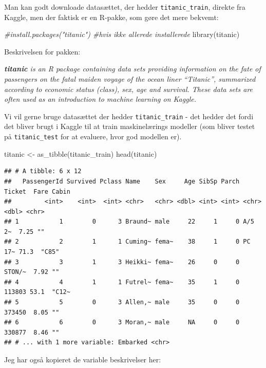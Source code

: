 \documentclass[
]{book}
\newenvironment{Shaded}{\begin{snugshade}}{\end{snugshade}}
\newcommand{\CommentTok}[1]{\textcolor[rgb]{0.56,0.35,0.01}{\textit{#1}}}
\newcommand{\FunctionTok}[1]{\textcolor[rgb]{0.00,0.00,0.00}{#1}}
\newcommand{\NormalTok}[1]{#1}
\newcommand{\OtherTok}[1]{\textcolor[rgb]{0.56,0.35,0.01}{#1}}
\begin{document}
Man kan godt downloade datasættet, der hedder \texttt{titanic\_train}, direkte fra Kaggle, men der faktisk er en R-pakke, som gøre det mere bekvemt:

\begin{Shaded}
\begin{Highlighting}[]
\CommentTok{\#install.packages("titanic") \#hvis ikke allerede installerede}
\FunctionTok{library}\NormalTok{(titanic)}
\end{Highlighting}
\end{Shaded}

Beskrivelsen for pakken:

\emph{\textbf{titanic} is an R package containing data sets providing information on the fate of passengers on the fatal maiden voyage of the ocean liner ``Titanic'', summarized according to economic status (class), sex, age and survival. These data sets are often used as an introduction to machine learning on Kaggle.}

Vi vil gerne bruge datasættet der hedder \texttt{titanic\_train} - det hedder det fordi det bliver brugt i Kaggle til at train maskinelærings modeller (som bliver testet på \texttt{titanic\_test} for at evaluere, hvor god modellen er).

\begin{Shaded}
\begin{Highlighting}[]
\NormalTok{titanic }\OtherTok{\textless{}{-}} \FunctionTok{as\_tibble}\NormalTok{(titanic\_train)}
\FunctionTok{head}\NormalTok{(titanic)}
\end{Highlighting}
\end{Shaded}

\begin{verbatim}
## # A tibble: 6 x 12
##   PassengerId Survived Pclass Name    Sex     Age SibSp Parch Ticket  Fare Cabin
##         <int>    <int>  <int> <chr>   <chr> <dbl> <int> <int> <chr>  <dbl> <chr>
## 1           1        0      3 Braund~ male     22     1     0 A/5 2~  7.25 ""   
## 2           2        1      1 Cuming~ fema~    38     1     0 PC 17~ 71.3  "C85"
## 3           3        1      3 Heikki~ fema~    26     0     0 STON/~  7.92 ""   
## 4           4        1      1 Futrel~ fema~    35     1     0 113803 53.1  "C12~
## 5           5        0      3 Allen,~ male     35     0     0 373450  8.05 ""   
## 6           6        0      3 Moran,~ male     NA     0     0 330877  8.46 ""   
## # ... with 1 more variable: Embarked <chr>
\end{verbatim}

Jeg har også kopieret de variable beskrivelser her:
\end{document}

